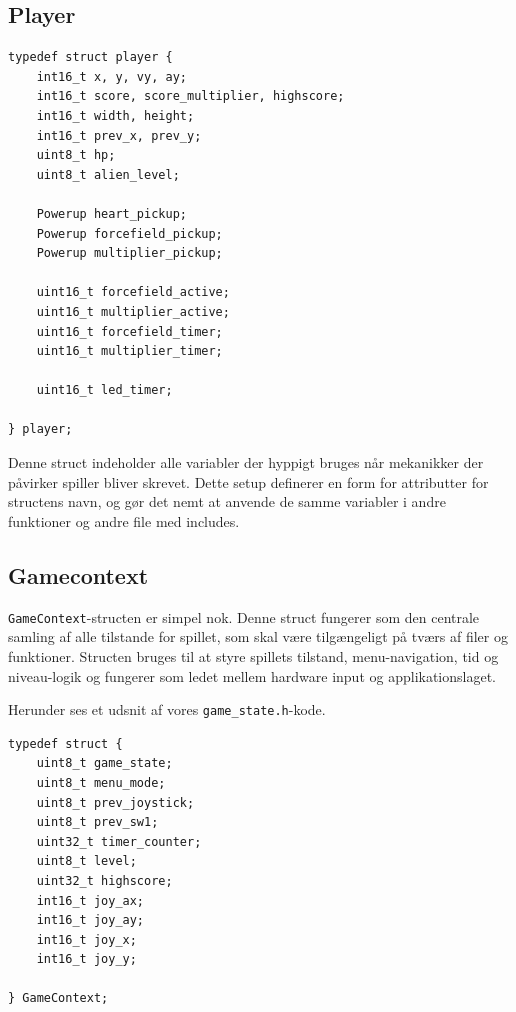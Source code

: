 \vspace{3pt}
\subsection{Player}
\vspace{1em}

    \begin{lstlisting} 
typedef struct player {
    int16_t x, y, vy, ay;
    int16_t score, score_multiplier, highscore;
    int16_t width, height;
    int16_t prev_x, prev_y;
    uint8_t hp;
    uint8_t alien_level;

    Powerup heart_pickup;
    Powerup forcefield_pickup;
    Powerup multiplier_pickup;

	uint16_t forcefield_active;
	uint16_t multiplier_active;	
	uint16_t forcefield_timer;
	uint16_t multiplier_timer;

	uint16_t led_timer;

} player;
    \end{lstlisting}
\vspace{-2em}

Denne struct indeholder alle variabler der hyppigt bruges når mekanikker der påvirker spiller bliver skrevet. Dette setup definerer en form for attributter for structens navn, og gør det nemt at anvende de samme variabler i andre funktioner og andre file med includes.


\vspace{3pt}
\subsection{Gamecontext}
\vspace{3pt}

\lstinline!GameContext!-structen er simpel nok. Denne struct fungerer som den centrale samling af alle tilstande for spillet, som skal være tilgængeligt på tværs af filer og funktioner. Structen bruges til at styre spillets tilstand, menu-navigation, tid og niveau-logik og fungerer som ledet mellem hardware input og applikationslaget.

Herunder ses et udsnit af vores \texttt{game\_state.h}-kode. 

\vspace{1em}
 \begin{lstlisting}
typedef struct {
    uint8_t game_state;
    uint8_t menu_mode;
    uint8_t prev_joystick;
    uint8_t prev_sw1;
    uint32_t timer_counter;
    uint8_t level;
    uint32_t highscore;
    int16_t joy_ax;
    int16_t joy_ay;
    int16_t joy_x; 
    int16_t joy_y;

} GameContext;
 \end{lstlisting}
\vspace{-2em}

